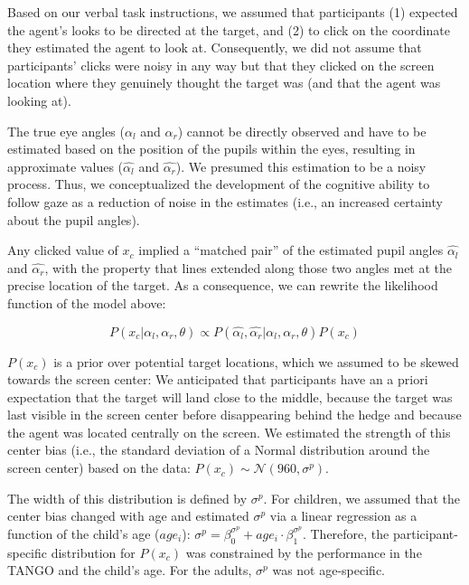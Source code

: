\documentclass[
  man,mask,floatsintext]{apa7}
\begin{document}
Based on our verbal task instructions, we assumed that participants (1) expected the agent's looks to be directed at the target, and (2) to click on the coordinate they estimated the agent to look at. Consequently, we did not assume that participants' clicks were noisy in any way but that they clicked on the screen location where they genuinely thought the target was (and that the agent was looking at).

The true eye angles (\(\alpha_l\) and \(\alpha_r\)) cannot be directly observed and have to be estimated based on the position of the pupils within the eyes, resulting in approximate values (\(\hat{\alpha_l}\) and \(\hat{\alpha_r}\)). We presumed this estimation to be a noisy process. Thus, we conceptualized the development of the cognitive ability to follow gaze as a reduction of noise in the estimates (i.e., an increased certainty about the pupil angles).

Any clicked value of \(x_c\) implied a ``matched pair'' of the estimated pupil angles \(\hat{\alpha_l}\) and \(\hat{\alpha_r}\), with the property that lines extended along those two angles met at the precise location of the target. As a consequence, we can rewrite the likelihood function of the model above:

\begin{equation}
P(x_c | \alpha_l, \alpha_r, \theta) \propto P(\hat{\alpha_l}, \hat{\alpha_r} | \alpha_l, \alpha_r, \theta) P(x_c)
\end{equation}

\(P(x_c)\) is a prior over potential target locations, which we assumed to be skewed towards the screen center: We anticipated that participants have an a priori expectation that the target will land close to the middle, because the target was last visible in the screen center before disappearing behind the hedge and because the agent was located centrally on the screen. We estimated the strength of this center bias (i.e., the standard deviation of a Normal distribution around the screen center) based on the data: \(P(x_c) \sim \mathcal{N}(960, \sigma^p)\).

The width of this distribution is defined by \(\sigma^p\). For children, we assumed that the center bias changed with age and estimated \(\sigma^p\) via a linear regression as a function of the child's age (\(age_i\)): \(\sigma^p = \beta_0^{\sigma^p} + age_i \cdot \beta_1^{\sigma^p}\). Therefore, the participant-specific distribution for \(P(x_c)\) was constrained by the performance in the TANGO and the child's age. For the adults, \(\sigma^p\) was not age-specific.
\end{document}
